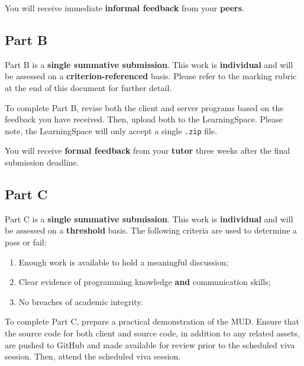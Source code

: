 \documentclass{../../fal_assignment}
\begin{document}
You will receive immediate \textbf{informal feedback} from your \textbf{peers}.

\subsection*{Part B}

Part B is a \textbf{single summative submission}. This work is \textbf{individual} and will be assessed on a \textbf{criterion-referenced} basis. Please refer to the marking rubric at the end of this document for further detail.

To complete Part B, revise both the client and server programs based on the feedback you have received. Then, upload both to the LearningSpace. Please note, the LearningSpace will only accept a single \texttt{.zip} file.

You will receive \textbf{formal feedback} from your \textbf{tutor} three weeks after the final submission deadline.

\subsection*{Part C}

Part C is a \textbf{single summative submission}. This work is \textbf{individual} and will be assessed on a \textbf{threshold} basis.  The following criteria are used to determine a pass or fail:

\begin{enumerate}[label=(\alph*)]
	\item Enough work is available to hold a meaningful discussion;
	\item Clear evidence of programming knowledge \textbf{and} communication skills;
	\item No breaches of academic integrity.
\end{enumerate}

To complete Part C, prepare a practical demonstration of the MUD. Ensure that the source code for both client and source code, in addition to any related assets, are pushed to GitHub and made available for review prior to the scheduled viva session. Then, attend the scheduled viva session.

\end{document}
